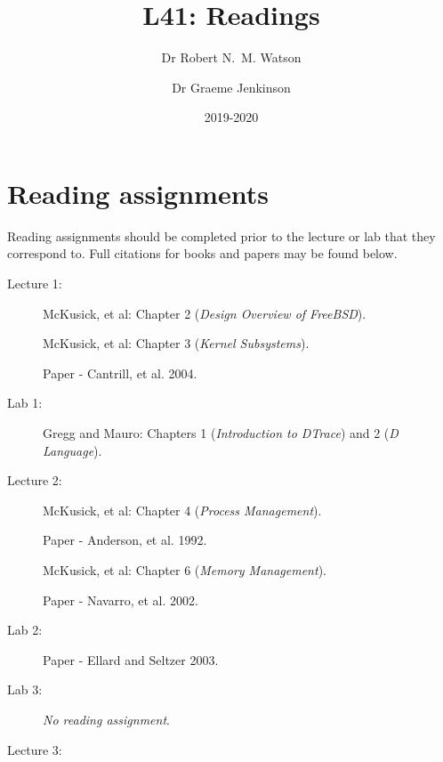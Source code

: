 \documentclass[a4paper,10pt]{article}
\begin{document}
\title{L41: Readings}
\author{Dr Robert N.~M. Watson \and Dr Graeme Jenkinson}
\date{2019-2020}
\maketitle

\section*{Reading assignments}
Reading assignments should be completed prior to the lecture or lab that they
correspond to.
Full citations for books and papers may be found below.

\begin{description}
\item[Lecture 1:]

  McKusick, et al: Chapter 2 (\textit{Design Overview of FreeBSD}).


  McKusick, et al: Chapter 3 (\textit{Kernel Subsystems}).

  Paper - Cantrill, et al. 2004.

\item[Lab 1:]

  Gregg and Mauro: Chapters 1 (\textit{Introduction to DTrace}) and
  2 (\textit{D Language}).

\item[Lecture 2:]

  McKusick, et al: Chapter 4 (\textit{Process Management}).

  Paper - Anderson, et al. 1992.


  McKusick, et al: Chapter 6 (\textit{Memory Management}).

  Paper - Navarro, et al. 2002.

\item[Lab 2:]

  Paper - Ellard and Seltzer 2003.

\item[Lab 3:]


  \textit{No reading assignment}.

\item[Lecture 3:]


\end{description}
\end{document}
